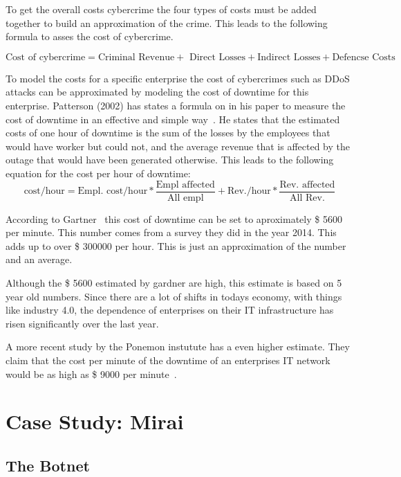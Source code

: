 To get the overall costs cybercrime the four types of costs must be added together to build an approximation of the crime.
This leads to the following formula to asses the cost of cybercrime.

\begin{equation}
\text{Cost of cybercrime} = \text{Criminal Revenue} +\text{ Direct Losses} + \text{Indirect Losses} + \text{Defencse Costs}
\end{equation}

To model the costs for a specific enterprise the cost of cybercrimes such as DDoS attacks can be approximated by modeling the cost of downtime for this enterprise.
Patterson (2002) has states a formula on in his paper to measure the cost of downtime in an effective and simple way~\cite{Patterson02}.
He states that the estimated costs of one hour of downtime is the sum of the losses by the employees that would have worker but could not, and the average revenue that is affected by the outage that would have been generated otherwise.
This leads to the following equation for the cost per hour of downtime: 
\begin{equation}
\text{cost/hour} = \text{Empl. cost/hour} * \frac{\text{Empl affected}}{\text{All empl}} + \text{Rev./hour} * \frac{\text{Rev. affected}}{\text{All Rev.}}
\end{equation}

According to Gartner~\cite{Lerner14} this cost of downtime can be set to aproximately \$ 5600 per minute.
This number comes from a survey they did in the year 2014.
This adds up to over \$ 300000 per hour.
This is just an approximation of the number and an average.

Although the \$ 5600 estimated by gardner are high, this estimate is based on 5 year old numbers.
Since there are a lot of shifts in todays economy, with things like industry 4.0, the dependence of enterprises on their IT infrastructure has risen significantly over the last year.

A more recent study by the Ponemon instutute has a even higher estimate.
They claim that the cost per minute of the downtime of an enterprises IT network would be as high as \$ 9000 per minute~\cite{Ponemon16}.

\section{Case Study: Mirai}
\subsection{The Botnet}
